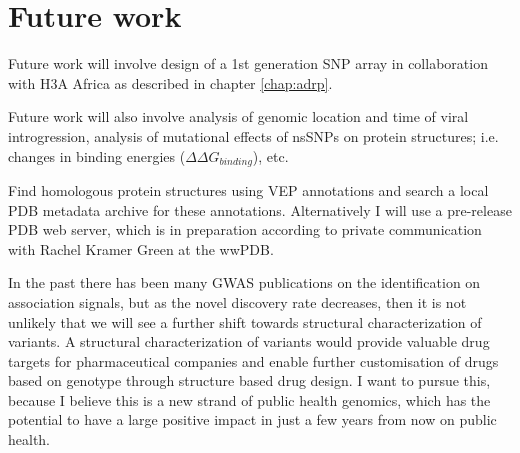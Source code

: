 \chapter{Future work}
\label{chap:future}

Future work will involve design of a 1st generation SNP array in collaboration with H3A Africa as described in chapter \ref{chap:adrp}.

Future work will also involve analysis of genomic location and time of viral introgression, analysis of mutational effects of nsSNPs on protein structures; i.e. changes in binding energies ($\Delta \Delta G_{binding}$), etc.

Find homologous protein structures using \gls{VEP} annotations and search a local \gls{PDB} metadata archive for these annotations. Alternatively I will use a pre-release \gls{PDB} web server, which is in preparation according to private communication with Rachel Kramer Green at the \gls{wwPDB}.

In the past there has been many \gls{GWAS} publications on the identification on association signals, but as the novel discovery rate decreases, then it is not unlikely that we will see a further shift towards structural characterization of variants.\cite{Teng2009}\cite{Kucukkal201518} A structural characterization of variants would provide valuable drug targets for pharmaceutical companies and enable further customisation of drugs based on genotype through structure based drug design.\cite{Kuntz21081992} I want to pursue this, because I believe this is a new strand of public health genomics, which has the potential to have a large positive impact in just a few years from now on public health.